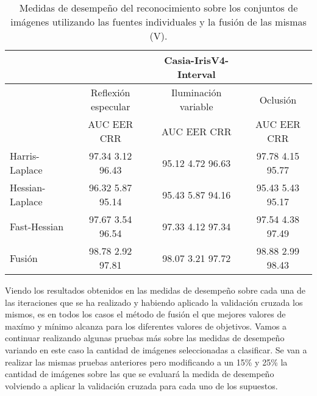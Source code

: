 \begin{table}[h]
\begin{center}
\begin{tabular}{@{}lccc@{}}
\toprule
&& Casia-IrisV4-Interval & \\ \hline
&Reflexión especular		&  	Iluminación variable		& Oclusión \\ \hline
&AUC  \phantom{aa} EER  \phantom{aa} CRR &  	AUC  \phantom{aa} EER  \phantom{aa} CRR		& AUC  \phantom{aa} EER  \phantom{aa} CRR \\ \hline
Harris-Laplace& 97.34 \phantom{aa} 3.12  \phantom{aa} 96.43 &  	95.12 \phantom{aa} 4.72  \phantom{aa}96.63		& 97.78 \phantom{aa} 4.15 \phantom{aa} 95.77 \\
Hessian-Laplace& 96.32 \phantom{aa} 5.87 \phantom{aa} 95.14 &  	95.43 \phantom{aa} 5.87 \phantom{aa} 94.16 & 95.43 \phantom{aa} 5.43 \phantom{aa} 95.17 \\
Fast-Hessian& 97.67  \phantom{aa}3.54 \phantom{aa}  96.54 &  	97.33 \phantom{aa} 4.12  \phantom{aa}97.34		& 97.54  \phantom{aa}4.38 \phantom{aa} 97.49 \\
Fusión& 98.78 \phantom{aa} 2.92  \phantom{aa}97.81 &  	98.07  \phantom{aa}3.21 \phantom{aa} 97.72		& 98.88 \phantom{aa} 2.99 \phantom{aa}98.43 \\ \hline

\end{tabular}
\end{center}
\caption{Medidas de desempeño del reconocimiento sobre los conjuntos de imágenes utilizando las fuentes individuales y la fusión de las mismas (V).}
\label{my_tabla}
\end{table}


Viendo los resultados obtenidos en las medidas de desempeño sobre cada una de las iteraciones que se ha realizado y habiendo aplicado la validación cruzada los mismos, es en todos los casos el método de fusión el que mejores valores de maxímo y mínimo alcanza para los diferentes valores de objetivos. Vamos a continuar realizando algunas pruebas más sobre las medidas de desempeño variando en este caso la cantidad de imágenes seleccionadas a clasificar. Se van a realizar las mismas pruebas anteriores pero modificando a un 15\% y 25\% la cantidad de imágenes sobre las que se evaluará la medida de desempeño volviendo a aplicar la validación cruzada para cada uno de los supuestos.\\ 


